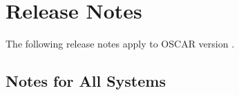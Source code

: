 %
% 
%
%

\section{Release Notes}
\label{sec:release-notes}

The following release notes apply to OSCAR version \oscarversion.


\subsection{Notes for All Systems}
\label{subsec:release-notes}

